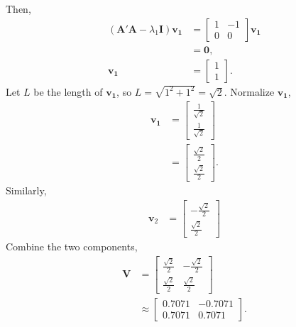 \documentclass[10pt]{article}
\begin{document}
\begin{enumerate}[1)]
Then,
\begin{align*}
(\pmb{A}'\pmb{A}-\lambda_1\pmb{I})\pmb{v_1}&=
  \begin{bmatrix}
    1 & -1\\
    0 & 0
  \end{bmatrix}
\pmb{v_1}\\
&=\pmb{0},\\
\pmb{v_1}&=
  \begin{bmatrix}
    1\\
    1
  \end{bmatrix}
.
\end{align*}
Let $L$ be the length of $\pmb{v_1}$, so $L=\sqrt{1^2+1^2}=\sqrt{2}$.
Normalize $\pmb{v_1}$,
\begin{align*}
\pmb{v_1}&=
  \begin{bmatrix}
    \frac{1}{\sqrt{2}}\\
    \frac{1}{\sqrt{2}}
  \end{bmatrix}
\\
&=
  \begin{bmatrix}
    \frac{\sqrt{2}}{2}\\
    \frac{\sqrt{2}}{2}
  \end{bmatrix}
.
\end{align*}
Similarly,
\begin{align*}
\pmb{v}_2&=
  \begin{bmatrix}
    -\frac{\sqrt{2}}{2}\\
    \frac{\sqrt{2}}{2}
  \end{bmatrix}
\end{align*}
Combine the two components,
\begin{align*}
\pmb{V}&=
  \begin{bmatrix}
    \frac{\sqrt{2}}{2} & -\frac{\sqrt{2}}{2}\\
    \frac{\sqrt{2}}{2} & \frac{\sqrt{2}}{2}
  \end{bmatrix}
\\
&\approx
  \begin{bmatrix}
    0.7071 & -0.7071\\
    0.7071 & 0.7071
  \end{bmatrix}
.
\end{align*}


\end{enumerate}
\end{document}
